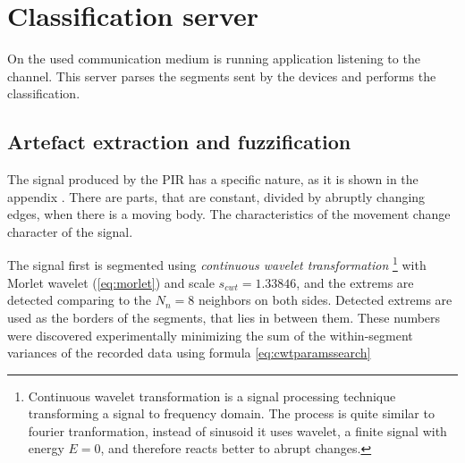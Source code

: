 


\section{Classification server}
\label{section:classification}
On the used communication medium is running application listening to the channel.
This server parses the segments sent by the devices and performs the classification.


\subsection*{Artefact extraction and fuzzification}
The signal produced by the PIR has a specific nature, as it is shown in the appendix \label{appendix:PIRSignal}.
There are parts, that are constant, divided by abruptly changing edges, when there is a moving body. The
characteristics of the movement change character of the signal.

The signal first is segmented using {\it continuous wavelet transformation}
\footnote{
Continuous wavelet transformation is a signal processing technique transforming a signal to frequency domain.
The process is quite similar to fourier tranformation, instead of sinusoid it uses wavelet, a finite signal with
energy $E=0$, and therefore reacts better to abrupt changes.\cite{WaveletTour}}
with Morlet wavelet (\ref{eq:morlet})
and scale $s_{cwt} = 1.33846$, and the extrems are detected comparing to the $N_{n} = 8$ neighbors on both sides.
Detected extrems are used as the borders of the segments, that lies in between them. These numbers were
discovered experimentally minimizing the sum of the within-segment variances of the recorded data using formula \ref{eq:cwtparamssearch}



